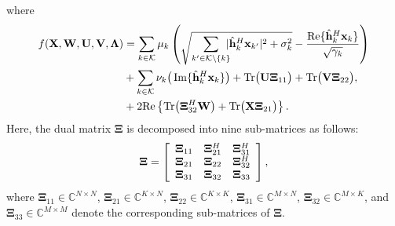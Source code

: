 \documentclass[12pt, draftclsnofoot, onecolumn]{IEEEtran}
\begin{document}
where
\begin{equation}\notag
\begin{aligned}
f(\mathbf{X},\mathbf{W},\mathbf{U},\mathbf{V},\bm{\Lambda})&=\sum_{k\in\mathcal{K}}\mu_k\left(\sqrt{\sum_{k'\in\mathcal{K}\setminus\{k\}}\hspace*{-2mm}|\hat{\mathbf{h}}_k^H\mathbf{x}_{k'}|^2+\sigma_k^2}-\frac{\operatorname{Re}\{\hat{\mathbf{h}}_k^H\mathbf{x}_k\}}{\sqrt{\gamma_k}}\right)\\
    &+\sum_{k\in\mathcal{K}}\nu_k\big(\operatorname{Im}\{\hat{\mathbf{h}}_k^H\mathbf{x}_k\}\big)+\mathrm{Tr}\big(\mathbf{U}\bm{\Xi}_{11}\big)+\mathrm{Tr}\big(\mathbf{V}\bm{\Xi}_{22}\big),\\
    &+2\mathrm{Re}\left\{\mathrm{Tr}\big({\bm{\Xi}^H_{32}}\mathbf{W}\big)+\mathrm{Tr}\big(\mathbf{X}\bm{\Xi}_{21}\big)\right\}.
\end{aligned}
\end{equation}
Here, the dual matrix $\bm{\Xi}$ is decomposed into nine sub-matrices as follows:
\begin{equation}\label{Qi}
  \bm{\Xi}=\left[ \begin{array}{ccc}
        \bm{\Xi}_{11} & \bm{\Xi}_{21}^H & \bm{\Xi}_{31}^H\\
        \bm{\Xi}_{21} & \bm{\Xi}_{22} & \bm{\Xi}_{32}^H\\
        \bm{\Xi}_{31} & \bm{\Xi}_{32} & \bm{\Xi}_{33}
    \end{array}\right],\vspace*{-2mm}
\end{equation}
where $\bm{\Xi}_{11}\in\mathbb{C}^{N\times N}$, $\bm{\Xi}_{21}\in\mathbb{C}^{K\times N}$, $\bm{\Xi}_{22}\in\mathbb{C}^{K\times K}$, $\bm{\Xi}_{31}\in\mathbb{C}^{M\times N}$, $\bm{\Xi}_{32}\in\mathbb{C}^{M\times K}$, and $\bm{\Xi}_{33}\in\mathbb{C}^{M\times M}$ denote the corresponding sub-matrices of $\bm{\Xi}$. 
\end{document}

